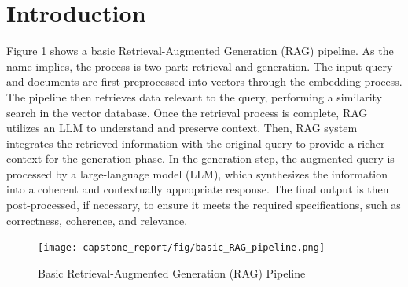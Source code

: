 \documentclass{scrartcl}
\begin{document}
\tableofcontents
\newpage
\section{Introduction}

Figure 1 shows a basic Retrieval-Augmented Generation (RAG) pipeline. As the name implies, the process is two-part: retrieval and generation.
The input query and documents are first preprocessed into vectors through the embedding process.
The pipeline then retrieves data relevant to the query, performing a similarity search in the vector database. Once the retrieval process is complete, RAG utilizes an LLM to understand and preserve context. Then, RAG system integrates the retrieved information with the original query to provide a richer context for the generation phase.
In the generation step, the augmented query is processed by a large-language model (LLM), which synthesizes the information into a coherent and contextually appropriate response. The final output is then post-processed, if necessary, to ensure it meets the required specifications, such as correctness, coherence, and relevance.

\begin{figure}[H]
	\begin{center}
		\texttt{[image: capstone\_report/fig/basic\_RAG\_pipeline.png]}
	\end{center}
	\caption{Basic Retrieval-Augmented Generation (RAG) Pipeline}
	\label{fig:ascent}
\end{figure}
\end{document}
